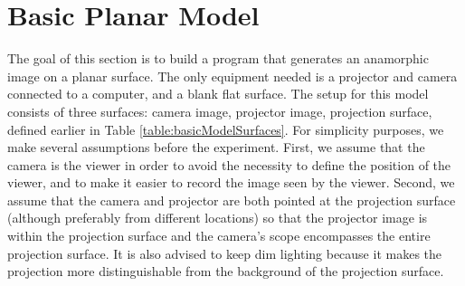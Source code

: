 \documentclass[11pt, oneside, reqno]{book}
\begin{document}

\section{Basic Planar Model} %
\label{sec:basicModel} 

The goal of this section is to build a program that generates an anamorphic image on a planar surface. The only equipment needed is a projector and camera connected to a computer, and a blank flat surface. The setup for this model consists of three surfaces: camera image, projector image, projection surface, defined earlier in Table \ref{table:basicModelSurfaces}. For simplicity purposes, we make several assumptions before the experiment. First, we assume that the camera is the viewer in order to avoid the necessity to define the position of the viewer, and to make it easier to record the image seen by the viewer. Second, we assume that the camera and projector are both pointed at the projection surface (although preferably from different locations) so that the projector image is within the projection surface and the camera's scope encompasses the entire projection surface. It is also advised to keep dim lighting because it makes the projection more distinguishable from the background of the projection surface.



%
\end{document}
